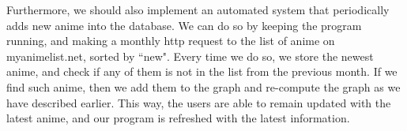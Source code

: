 \documentclass[12pt]{article}
\begin{document}
\begin{enumerate}
\begin{text}
Furthermore, we should also implement an automated system that periodically adds new anime into the database. We can do so by keeping the program running, and making a monthly http request to the list of anime on myanimelist.net, sorted by ``new". Every time we do so, we store the newest anime, and check if any of them is not in the list from the previous month. If we find such anime, then we add them to the graph and re-compute the graph as we have described earlier. This way, the users are able to remain updated with the latest anime, and our program is refreshed with the latest information.
\end{text}


\maketitle

\newpage




\end{enumerate}
\end{document}
